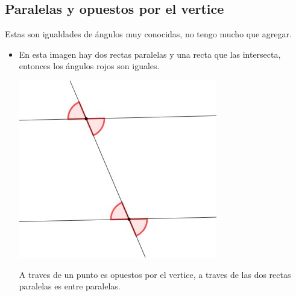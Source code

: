\documentclass[11pt]{scrartcl}
\begin{document}
\subsection{Paralelas y opuestos por el vertice}
Estas son igualdades de \'angulos muy conocidas, no tengo mucho que agregar.
\begin{itemize}
    
   \item En esta imagen hay dos rectas paralelas y una recta que las intersecta, entonces los \'angulos rojos son iguales.
    \begin{center}
    \includegraphics[scale=.5]{AC2.jpg}
    \end{center}
    A traves de un punto es opuestos por el vertice, a traves de las dos rectas paralelas es entre paralelas.
\end{itemize}
\end{document}
